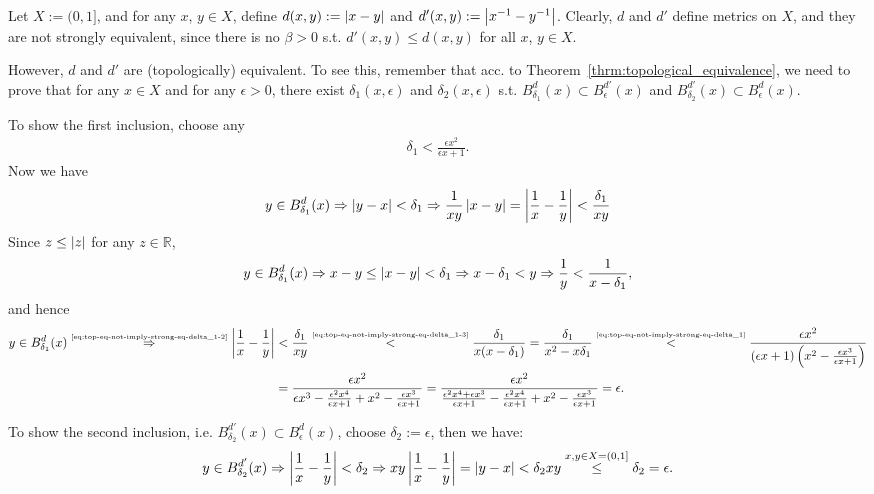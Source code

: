 \begin{exmp}
	Let $X := (0, 1]$, and for any $x$, $y\in X$, define $d(x, y) := \left\vert x - y \right\vert$ and \newline $d'(x, y) := \left\vert x^{-1} - y^{-1} \right\vert$. Clearly, $d$ and $d'$ define metrics on $X$, and they are not strongly equivalent, since there is no $\beta > 0$ s.t. $d'(x, y) \leq d(x, y)$ for all $x$, $y\in X$. 
	
	However, $d$ and $d'$ are (topologically) equivalent. To see this, remember that acc. to \mbox{Theorem \ref{thrm:topological_equivalence}}, we need to prove that for any $x\in X$ and for any $\epsilon > 0$, there exist $\delta_{1}(x, \epsilon)$ and $\delta_2(x, \epsilon)$ s.t. $B_{\delta_1}^{d}(x) \subset B_{\epsilon}^{d'}(x)$ and $B_{\delta_2}^{d'}(x) \subset B_{\epsilon}^{d}(x)$. 
	
	To show the first inclusion, choose any
	\begin{align}\label{eq:top-eq-not-imply-strong-eq-delta_1}
		\delta_{1} < \frac{\epsilon x^2}{\epsilon x + 1}.
	\end{align}
	Now we have 
	\begin{align}\label{eq:top-eq-not-imply-strong-eq-delta_1-2}
		y \in B_{\delta_1}^{d}(x) \Rightarrow \left\vert y - x \right\vert < \delta_1 \Rightarrow \frac{1}{xy}\left\vert x - y \right\vert = \left\vert \frac{1}{x} - \frac{1}{y} \right\vert < \frac{\delta_1}{xy}
	\end{align}
	Since $z \leq \left\vert z \right\vert$ for any $z\in\mathbb R$, 
	\begin{align}\label{eq:top-eq-not-imply-strong-eq-delta_1-3}
		y \in B_{\delta_1}^{d}(x) \Rightarrow x - y \leq \left\vert x-y \right\vert < \delta_1 \Rightarrow x - \delta_1 < y\Rightarrow \frac{1}{y} < \frac{1}{x - \delta_1},
	\end{align}
	and hence 
	\begin{align}
		y \in B_{\delta_1}^{d}(x) \overset{\tiny \eqref{eq:top-eq-not-imply-strong-eq-delta_1-2}}{\Rightarrow} \left\vert \frac{1}{x} - \frac{1}{y} \right\vert &< \frac{\delta_1}{xy} \overset{\tiny \eqref{eq:top-eq-not-imply-strong-eq-delta_1-3}}{<} \frac{\delta_1}{x(x - \delta_1)} = \frac{\delta_1}{x^2 - x\delta_1} \overset{\tiny \eqref{eq:top-eq-not-imply-strong-eq-delta_1}}{<} \frac{\epsilon x^2}{\left(\epsilon x + 1\right)\left(x^2 - \frac{\epsilon x^3}{\epsilon x + 1}\right)} 
		\\ &= \frac{\epsilon x^2}{\epsilon x^3 - \frac{\epsilon^2 x^4}{\epsilon x + 1} + x^2 - \frac{\epsilon x^3}{\epsilon x + 1}} = \frac{\epsilon x^2}{\frac{\epsilon^2 x^4 + \epsilon x^3}{\epsilon x + 1} - \frac{\epsilon^2 x^4}{\epsilon x + 1} + x^2 - \frac{\epsilon x^3}{\epsilon x + 1}} = \epsilon.
	\end{align}
	
	To show the second inclusion, i.e. $B_{\delta_2}^{d'}(x) \subset B_{\epsilon}^{d}(x)$, choose $\delta_2 := \epsilon$, then we have:
	\begin{align}
		y \in B_{\delta_2}^{d'}(x) \Rightarrow \left\vert \frac{1}{x} - \frac{1}{y} \right\vert < \delta_2 \Rightarrow xy\left\vert \frac{1}{x} - \frac{1}{y} \right\vert = \left\vert y - x \right\vert < \delta_2 xy \overset{x, y\in X = (0, 1]}{\leq} \delta_2 = \epsilon.
	\end{align}
\end{exmp}

